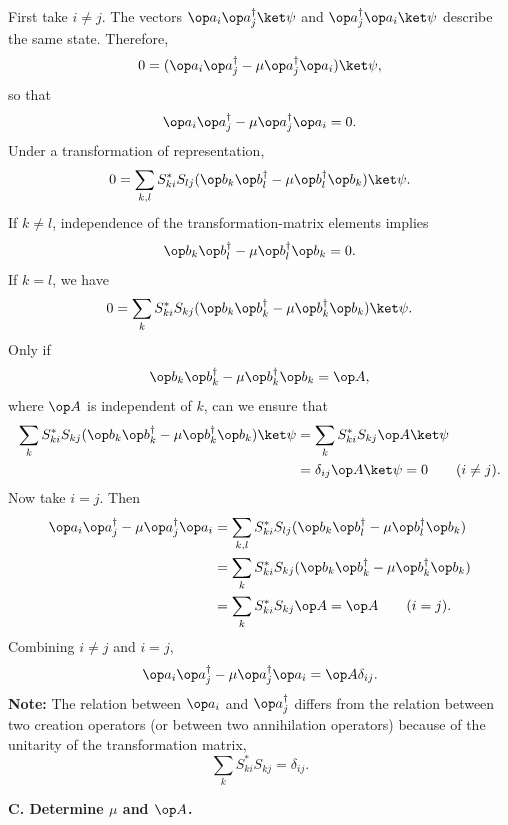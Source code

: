First take $i\ne j$. The vectors $\op a_i\op a_j^\dagger\ket\psi$ and $\op a_j^\dagger\op a_i\ket\psi$ describe the same state. Therefore,
\[0=(\op a_i\op a_j^\dagger-\mu\op a_j^\dagger\op a_i)\ket\psi,\]
so that
\[\op a_i\op a_j^\dagger-\mu\op a_j^\dagger\op a_i=0.\]
Under a transformation of representation,
\[0=\sum_{k,l}S_{ki}^*S_{lj}
(\op b_k\op b_l^\dagger-\mu\op b_l^\dagger\op b_k)\ket\psi.\]
If $k\ne l$, independence of the transformation-matrix elements implies
\[\op b_k\op b_l^\dagger-\mu\op b_l^\dagger\op b_k=0.\]
If $k=l$, we have
\[0=\sum_k S_{ki}^*S_{kj}
(\op b_k\op b_k^\dagger-\mu\op b_k^\dagger\op b_k)\ket\psi.\]
Only if
\[\op b_k\op b_k^\dagger-\mu\op b_k^\dagger\op b_k=\op A,\]
where $\op A$ is independent of $k$, can we ensure that
\begin{align*}
\sum_kS_{ki}^*S_{kj}
(\op b_k\op b_k^\dagger-\mu\op b_k^\dagger\op b_k)\ket\psi
&=\sum_kS_{ki}^*S_{kj}\op A\ket\psi\\
&=\delta_{ij}\op A\ket\psi=0\qquad(i\ne j).
\end{align*}
Now take $i=j$. Then
\begin{align*}
\op a_i\op a_j^\dagger-\mu\op a_j^\dagger\op a_i
&=\sum_{k,l}S_{ki}^*S_{lj}
(\op b_k\op b_l^\dagger-\mu\op b_l^\dagger\op b_k)\\
&=\sum_kS_{ki}^*S_{kj}(\op b_k\op b_k^\dagger-\mu\op b_k^\dagger\op b_k)\\
&=\sum_kS_{ki}^*S_{kj}\op A=\op A\qquad(i=j).
\end{align*}
Combining $i\ne j$ and $i=j$,
\[\op a_i\op a_j^\dagger-\mu\op a_j^\dagger\op a_i=\op A\delta_{ij}.\]
\textbf{Note:} The relation between $\op a_i$ and $\op a_j^\dagger$ differs from the relation between two creation operators (or between two annihilation operators) because of the unitarity of the transformation matrix,
\[\sum_kS_{ki}^*S_{kj}=\delta_{ij}.\]

\textbf{C. Determine $\mu$ and $\op A$.}


